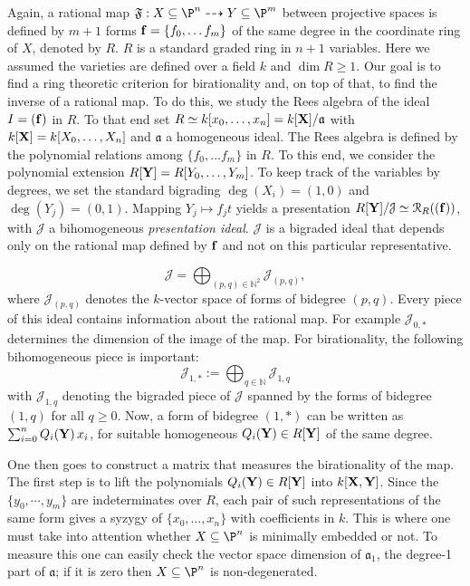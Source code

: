 \documentclass[11pt]{amsart}%
\numberwithin{equation}{theorem}
\def\ff{{\bf f}}
\def\XX{{\bf X}}
\def\YY{{\bf Y}}
\renewcommand{\:}{\colon}
\theoremstyle{theorem}
\begin{document}
Again, a rational map $\mathfrak{F}:X\subseteq \P^n\dasharrow Y \subseteq \P^m$ between projective spaces is defined by $m+1$ forms $\ff=\{f_0,\ldots f_m\}$ of the same degree in the coordinate ring of $X$, denoted by  $R$. $R$ is a standard graded ring in $n+1$ variables. Here we assumed the varieties are defined over a field $k$ and  $\dim R\geq 1$.
Our goal is to find a ring theoretic criterion for birationality and, on top of that, to find the inverse of a rational map.  To do this, we study the Rees algebra of the ideal $I=(\ff)$ in $R$.
To that end set $R\simeq k[x_0,\ldots, x_n]=k[\XX]/\mathfrak{a}$ with $k[\XX]=k[X_0,\ldots, X_n]$ and $\mathfrak{a}$ a homogeneous ideal. The Rees algebra is defined by the polynomial relations among $\{f_0,\ldots f_m\}$ in $R$. To this end, we consider the polynomial extension $R[\YY]=R[Y_0,\ldots,Y_m]$. To keep track of the variables by degrees, we set the standard  bigrading $\deg(X_i)=(1,0)$ and $\deg(Y_j)=(0,1)$. Mapping $Y_j\mapsto f_jt$ yields
a presentation $R[\YY]/\mathcal{J}\simeq {\mathcal R}_R((\ff))$, with $\mathcal{J}$ a bihomogeneous {\em presentation
ideal}.
$\mathcal{J}$ is a bigraded ideal that depends only on the rational map defined by $\ff$
and not on this particular representative.



$${\mathcal J}=\bigoplus_{(p,q)\in \mathbb{N}^2} {\mathcal J}_{(p,q)},$$
where ${\mathcal J}_{(p,q)}$ denotes the $k$-vector space of forms of bidegree $(p,q)$.
Every piece of this ideal contains information about the rational map. For example ${\mathcal J}_{0,*}$ determines the dimension of the image of the map.
For birationality, the following bihomogeneous piece is  important:
\[
    {\mathcal J}_{1,*}:=\bigoplus_{q\in\mathbb{N}} {\mathcal J}_{1,q}
\]
with ${\mathcal J}_{1,q}$ denoting the bigraded piece of ${\mathcal J}$ spanned by the forms of bidegree
 $(1,q)$ for all $q\geq 0$. Now, a form of bidegree $(1,*)$ can be written as $\sum_{i=0}^n Q_i(\YY)\,x_i$, for suitable homogeneous $Q_i(\YY)\in  R[\YY]$
of the same degree.

One then goes to construct a matrix that  measures the birationality of the map. The first step is to lift the polynomials $Q_i(\YY)\in  R[\YY]$ into $k[\XX,\YY]$.
Since the $\{y_0,\cdots,y_m\}$ are indeterminates over $R$, each pair of such representations of the same form gives a syzygy of $\{x_0,\ldots,x_n\}$
with coefficients in $k$.  This is where one must take into attention whether $X\subseteq \P^n$ is minimally embedded  or not. To measure this one can easily check the vector space dimension of ${\mathfrak a}_1$, the degree-1 part of $\mathfrak a$; if it is zero  then $X\subseteq \P^n$ is non-degenerated.
\end{document}
